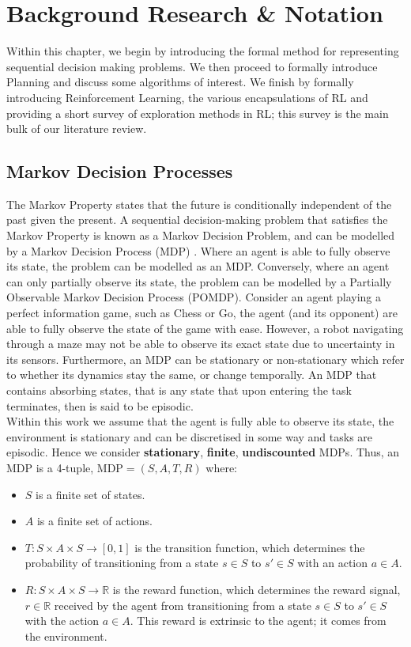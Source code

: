 \chapter{Background Research \& Notation}
\label{chapter2}
Within this chapter, we begin by introducing the formal method for representing sequential decision making problems. We then proceed to formally introduce Planning and discuss some algorithms of interest. We finish by formally introducing Reinforcement Learning, the various encapsulations of RL and providing a short survey of exploration methods in RL; this survey is the main bulk of our literature review.
\section{Markov Decision Processes}
The Markov Property states that the future is conditionally independent of the past given the present. A sequential decision-making problem that satisfies the Markov Property is known as a Markov Decision Problem, and can be modelled by a Markov Decision Process (MDP) \cite{10.5555/528623}. Where an agent is able to fully observe its state, the problem can be modelled as an MDP. Conversely, where an agent can only partially observe its state, the problem can be modelled by a Partially Observable Markov Decision Process (POMDP).
Consider an agent playing a perfect information game, such as Chess or Go, the agent (and its opponent) are able to fully observe the state of the game with ease. However, a robot navigating through a maze may not be able to observe its exact state due to uncertainty in its sensors.
Furthermore, an MDP can be stationary or non-stationary which refer to whether its dynamics stay the same, or change temporally.
An MDP that contains absorbing states, that is any state that upon entering the task terminates, then is said to be episodic.
\\Within this work we assume that the agent is fully able to observe its state, the environment is stationary and can be discretised in some way and tasks are episodic.
Hence we consider \textbf{stationary}, \textbf{finite}, \textbf{undiscounted} MDPs.
Thus, an MDP is a 4-tuple, $\text{MDP} = (S,A,T,R)$ where:
\begin{itemize}
    \item $S$ is a finite set of states.
    \item $A$ is a finite set of actions.
    \item $T : S \times A \times S \rightarrow [0,1]$ is the transition function, which determines the probability of transitioning from a state $s \in S$ to $s' \in S$ with an action $a \in A$.
    \item $R:S \times A \times S \rightarrow \mathbb{R}$ is the reward function, which determines the reward signal, $r \in \mathbb{R}$ received by the agent from transitioning from a state $s \in S$ to $s' \in S$ with the action $a \in A$. This reward is extrinsic to the agent; it comes from the environment.
\end{itemize}
